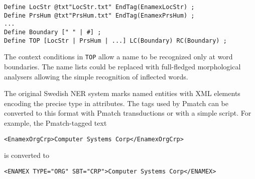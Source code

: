 \documentclass{llncs}
\begin{document}
\begin{verbatim}
Define LocStr @txt"LocStr.txt" EndTag(EnamexLocStr) ;
Define PrsHum @txt"PrsHum.txt" EndTag(EnamexPrsHum) ;
...
Define Boundary [" " | #] ;
Define TOP [LocStr | PrsHum | ...] LC(Boundary) RC(Boundary) ;
\end{verbatim}

\noindent
The context conditions in \texttt{TOP} allow a name to be recognized
only at word boundaries. The name lists could be replaced with
full-fledged morphological analysers allowing the simple recognition
of inflected words.



The original Swedish NER system marks named entities with XML elements
encoding the precise type in attributes. The tags used by Pmatch can
be converted to this format with Pmatch transductions or with a simple
script. For example, the Pmatch-tagged text
%
\begin{verbatim}
<EnamexOrgCrp>Computer Systems Corp</EnamexOrgCrp>
\end{verbatim}
is converted to
\begin{verbatim}
<ENAMEX TYPE="ORG" SBT="CRP">Computer Systems Corp</ENAMEX>
\end{verbatim}
\end{document}
